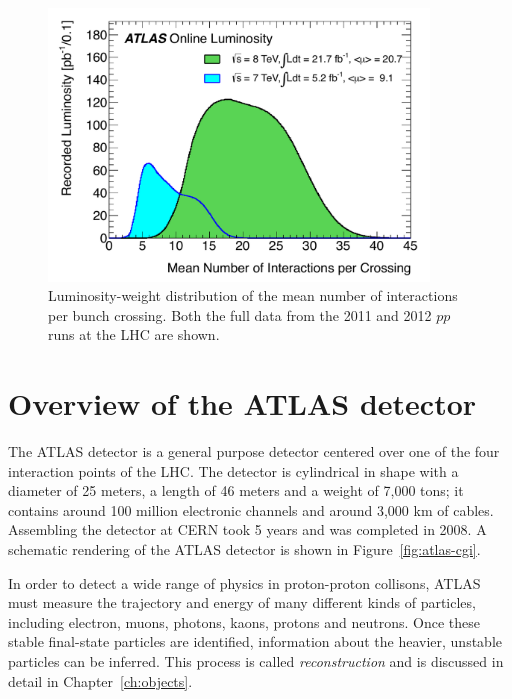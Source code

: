 \begin{figure}[tp]
  \centering
  \includegraphics[width=0.90\textwidth]{fig/atlas/pileup.pdf}
  \caption{Luminosity-weight distribution of the mean number of interactions per bunch crossing. Both the full data from the 2011 and 2012 $pp$ runs at the LHC are shown.}
  \label{fig:atlas-pileup}
\end{figure}



\section{Overview of the ATLAS detector}
The ATLAS detector is a general purpose detector centered over one of the four interaction points of the LHC. The detector is cylindrical in shape with a diameter of 25 meters, a length of 46 meters and a weight of 7,000 tons; it contains around 100 million electronic channels and around 3,000 km of cables. Assembling the detector at CERN took 5 years and was completed in 2008. A schematic rendering of the ATLAS detector is shown in Figure~\ref{fig:atlas-cgi}.

In order to detect a wide range of physics in proton-proton collisons, ATLAS must measure the trajectory and energy of many different kinds of particles, including electron, muons, photons, kaons, protons and neutrons. Once these stable final-state particles are identified, information about the heavier, unstable particles can be inferred. This process is called \emph{reconstruction} and is discussed in detail in Chapter~\ref{ch:objects}.

